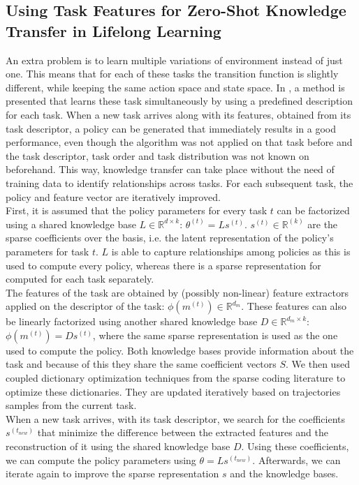 \documentclass[a4paper, 11pt]{article}
\begin{document}
\subsection{Using Task Features for Zero-Shot Knowledge Transfer in Lifelong Learning}
An extra problem is to learn multiple variations of environment instead of just one. This means that for each of these tasks the transition function is slightly different, while keeping the same action space and state space.
In \cite{Isele2016UsingLearning}, a method is presented that learns these task simultaneously by using a predefined description for each task.
When a new task arrives along with its features, obtained from its task descriptor, a policy can be generated that immediately results in a good performance, even though the algorithm was not applied on that task before and the task descriptor, task order and task distribution was not known on beforehand. This way, knowledge transfer can take place without the need of training data to identify relationships across tasks. For each subsequent task, the policy and feature vector are iteratively improved.\\
First, it is assumed that the policy parameters for every task $t$ can be factorized using a shared knowledge base $L \in \mathbb{R}^{d \times k}$: $\theta^{(t)} = Ls^{(t)}$. $s^{(t)} \in \mathbb{R}^{(k)}$ are the sparse coefficients over the basis, i.e. the latent representation of the policy's parameters for task $t$. $L$ is able to capture relationships among policies as this is used to compute every policy, whereas there is a sparse representation for computed for each task separately.\\
The features of the task are obtained by (possibly non-linear) feature extractors applied on the descriptor of the task: $\phi(m^{(t)}) \in \mathbb{R}^{d_m}$. These features can also be linearly factorized using another shared knowledge base $D \in \mathbb{R}^{d_m \times k}$: $\phi(m^{(t)}) = Ds^{(t)}$, where the same sparse representation is used as the one used to compute the policy. Both knowledge bases provide information about the task and because of this they share the same coefficient vectors $S$. We then used coupled dictionary optimization techniques from the sparse coding literature to optimize these dictionaries. They are updated iteratively based on trajectories samples from the current task.\\
When a new task arrives, with its task descriptor, we search for the coefficients $s^{(t_{new})}$ that minimize the difference between the extracted features and the reconstruction of it using the shared knowledge base $D$. Using these coefficients, we can compute the policy parameters using $\theta = Ls^{(t_{new})}$. Afterwards, we can iterate again to improve the sparse representation $s$ and the knowledge bases.
\end{document}
